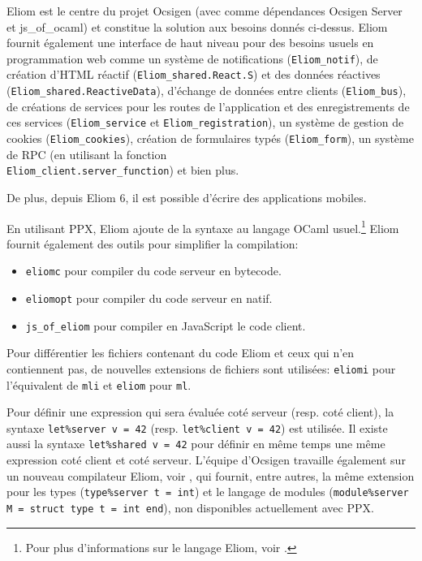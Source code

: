 Eliom est le centre du projet Ocsigen (avec comme dépendances Ocsigen Server et
js\_of\_ocaml) et constitue la solution aux besoins donnés ci-dessus.
Eliom fournit également une interface de haut
niveau pour des besoins usuels en programmation web comme un système de
notifications (\verb|Eliom_notif|), de création d'HTML réactif
(\verb|Eliom_shared.React.S|) et des données réactives
(\verb|Eliom_shared.ReactiveData|), d'échange de données entre clients
(\verb|Eliom_bus|), de créations de services pour les routes de l'application et
des enregistrements de ces services (\verb|Eliom_service| et
\verb|Eliom_registration|), un système de gestion de cookies
(\verb|Eliom_cookies|), création de formulaires typés
(\verb|Eliom_form|), un système de RPC (en utilisant la fonction \\
\verb|Eliom_client.server_function|) et bien plus.

De plus, depuis Eliom 6, il est possible d'écrire des applications mobiles.

En utilisant PPX, Eliom ajoute de la syntaxe au langage OCaml usuel.\footnote{Pour plus
d'informations sur le langage Eliom, voir \cite{gabriel-radanne-paper-eliom}.}
Eliom fournit également des outils pour simplifier la compilation:
\begin{itemize}
  \item \verb|eliomc| pour compiler du code serveur en bytecode.
  \item \verb|eliomopt| pour compiler du code serveur en natif.
  \item \verb|js_of_eliom| pour compiler en JavaScript le code client.
\end{itemize}

Pour différentier les fichiers contenant du code Eliom et ceux qui n'en \\
contiennent pas, de nouvelles extensions de fichiers sont utilisées: \verb|eliomi|
pour l'équivalent de \verb|mli| et \verb|eliom| pour \verb|ml|.

Pour définir une expression qui sera évaluée coté serveur (resp. coté client), la syntaxe
\verb|let%server v = 42| (resp. \verb|let%client v = 42|) est utilisée. Il
existe aussi la syntaxe \verb|let%shared v = 42| pour définir en même temps une
même expression coté client et coté serveur. L'équipe d'Ocsigen travaille
également sur un nouveau compilateur Eliom, voir
\cite{ocsigen-eliomlang-github}, qui fournit, entre autres, la même extension
pour les types (\verb|type%server t = int|) et le langage de modules
(\verb|module%server M = struct type t = int end|), non disponibles actuellement avec PPX.

